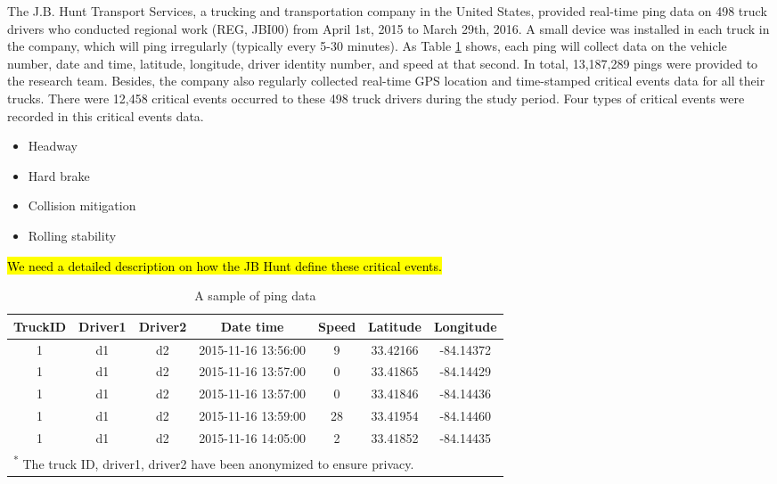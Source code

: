 \documentclass[]{elsarticle} %
\providecommand{\tightlist}{%
  \setlength{\itemsep}{0pt}\setlength{\parskip}{0pt}}
\begin{document}
The J.B. Hunt Transport Services, a trucking and transportation company in the United States, provided real-time ping data on 498 truck drivers who conducted regional work (REG, JBI00) from April 1st, 2015 to March 29th, 2016. A small device was installed in each truck in the company, which will ping irregularly (typically every 5-30 minutes). As Table \ref{tab:pingdata} shows, each ping will collect data on the vehicle number, date and time, latitude, longitude, driver identity number, and speed at that second. In total, 13,187,289 pings were provided to the research team. Besides, the company also regularly collected real-time GPS location and time-stamped critical events data for all their trucks. There were 12,458 critical events occurred to these 498 truck drivers during the study period. Four types of critical events were recorded in this critical events data.

\begin{itemize}
\tightlist
\item
  Headway
\item
  Hard brake
\item
  Collision mitigation
\item
  Rolling stability
\end{itemize}

\hl{We need a detailed description on how the JB Hunt define these critical events.}

\begin{table}[!h]

\caption{\label{tab:pingdata}A sample of ping data}
\centering
\begin{tabular}{ccccccc}
\toprule
TruckID & Driver1 & Driver2 & Date time & Speed & Latitude & Longitude\\
\midrule
1 & d1 & d2 & 2015-11-16 13:56:00 & 9 & 33.42166 & -84.14372\\
1 & d1 & d2 & 2015-11-16 13:57:00 & 0 & 33.41865 & -84.14429\\
1 & d1 & d2 & 2015-11-16 13:57:00 & 0 & 33.41846 & -84.14436\\
1 & d1 & d2 & 2015-11-16 13:59:00 & 28 & 33.41954 & -84.14460\\
1 & d1 & d2 & 2015-11-16 14:05:00 & 2 & 33.41852 & -84.14435\\
\bottomrule
\multicolumn{7}{l}{\textsuperscript{*} The truck ID, driver1, driver2 have been anonymized to ensure privacy.}\\
\end{tabular}
\end{table}
\end{document}
